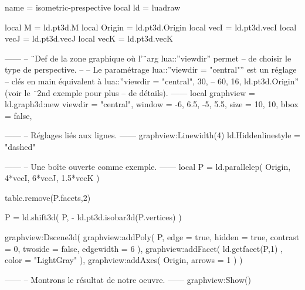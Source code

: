 \documentclass[border = 3pt]{standalone}
\begin{document}
\begin{luadraw*}{name = isometric-prespective}
local ld = luadraw

local M      = ld.pt3d.M
local Origin = ld.pt3d.Origin
local vecI   = ld.pt3d.vecI
local vecJ   = ld.pt3d.vecJ
local vecK   = ld.pt3d.vecK

------
-- ¨Def de la zone graphique où l'¨arg lua::''viewdir'' permet
-- de choisir le type de perspective.
--
-- Le paramétrage lua::''viewdir = "central"'' est un réglage
-- clés en main équivalent à lua::''viewdir = { "central", 30,
-- 60, 16, ld.pt3d.Origin}'' (voir le ¨2nd exemple pour plus
-- de détails).
------
local graphview = ld.graph3d:new{
  viewdir = "central",
  window  = {-6, 6.5, -5, 5.5},
  size    = {10, 10},
  bbox    = false,
}

------
-- Réglages liés aux lignes.
------
graphview:Linewidth(4)
ld.Hiddenlinestyle = "dashed"

------
-- Une boîte ouverte comme exemple.
------
local P = ld.parallelep(
  Origin,
  4*vecI, 6*vecJ, 1.5*vecK
)

table.remove(P.facets,2)

P = ld.shift3d(
  P,
  - ld.pt3d.isobar3d(P.vertices)
)

graphview:Dscene3d(
  graphview:addPoly(
    P,
    {
      edge      = true,
      hidden    = true,
      contrast  = 0,
      twoside   = false,
      edgewidth = 6
    }
  ),
  graphview:addFacet(
    ld.getfacet(P,1) ,
    {color = "LightGray"}
  ),
  graphview:addAxes(
    Origin,
    {arrows = 1}
  )
)

------
-- Montrons le résultat de notre oeuvre.
------
graphview:Show()
\end{luadraw*}
\end{document}
